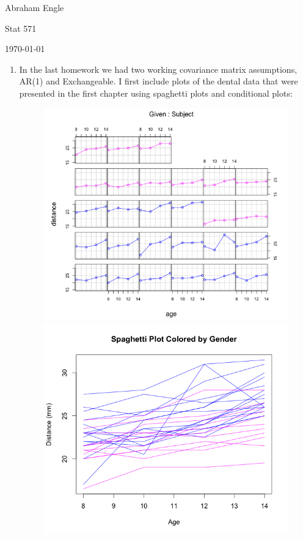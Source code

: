 \documentclass[11pt]{article}
\begin{document}
\pagestyle{empty}
\hfill Abraham Engle

\hfill Stat 571

\hfill \today
\begin{enumerate}
	\item In the last homework we had two working covariance matrix assumptions, AR(1) and Exchangeable. I first include plots of the dental data that were presented in the first chapter using spaghetti plots and conditional plots:
	\begin{figure}[H]
		\includegraphics[scale=0.4]{RplotConditional.png}
		\includegraphics[scale=0.4]{RplotSpaghetti.png}

\end{figure}
\end{enumerate}
\end{document}
